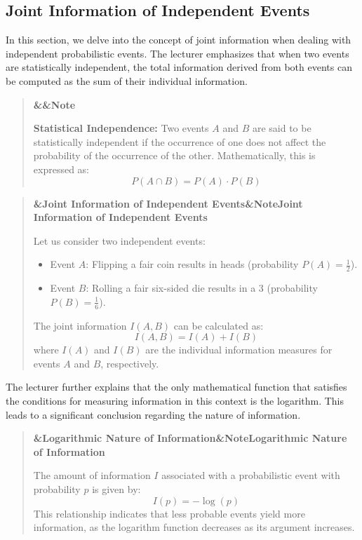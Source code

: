 \documentclass[a4paper]{article}
\newcommand{\boxheading}[1]{%
  \par\smallskip
  \noindent\textbf{\ifx&#1&Note\else#1\fi}\par
  \smallskip
}
\newenvironment{thmbox}[1][]{%
  \begin{quote}\color{blue!60!black}\boxheading{#1}\normalcolor
}{\end{quote}}
\newenvironment{defbox}[1][]{%
  \begin{quote}\color{green!40!black}\boxheading{#1}\normalcolor
}{\end{quote}}
\newenvironment{exbox}[1][]{%
  \begin{quote}\color{brown!70!black}\boxheading{#1}\normalcolor
}{\end{quote}}
\begin{document}
\subsection{Joint Information of Independent Events}
In this section, we delve into the concept of joint information when dealing with independent probabilistic events. The lecturer emphasizes that when two events are statistically independent, the total information derived from both events can be computed as the sum of their individual information.

\begin{defbox}
\textbf{Statistical Independence:} Two events \( A \) and \( B \) are said to be statistically independent if the occurrence of one does not affect the probability of the occurrence of the other. Mathematically, this is expressed as:
\[
P(A \cap B) = P(A) \cdot P(B)
\]
\end{defbox}

\begin{exbox}[Joint Information of Independent Events]
Let us consider two independent events:
\begin{itemize}
    \item Event \( A \): Flipping a fair coin results in heads (probability \( P(A) = \frac{1}{2} \)).
    \item Event \( B \): Rolling a fair six-sided die results in a 3 (probability \( P(B) = \frac{1}{6} \)).
\end{itemize}
The joint information \( I(A, B) \) can be calculated as:
\[
I(A, B) = I(A) + I(B)
\]
where \( I(A) \) and \( I(B) \) are the individual information measures for events \( A \) and \( B \), respectively.
\end{exbox}

The lecturer further explains that the only mathematical function that satisfies the conditions for measuring information in this context is the logarithm. This leads to a significant conclusion regarding the nature of information.

\begin{thmbox}[Logarithmic Nature of Information]
The amount of information \( I \) associated with a probabilistic event with probability \( p \) is given by:
\begin{equation}
I(p) = -\log(p)
\end{equation}
This relationship indicates that less probable events yield more information, as the logarithm function decreases as its argument increases.
\end{thmbox}
\end{document}
